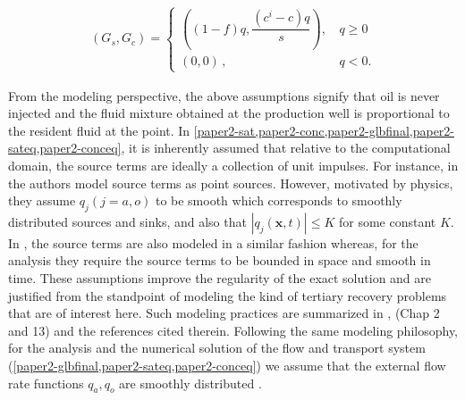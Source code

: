 \documentclass[11pt]{article}
\newcommand{\bx}{{\bf x}}
\newcommand{\lb}{\ensuremath{\lambda}}
\begin{document}
\begin{align}\label{paper2-eq:compat1}
(G_s, G_c) = \begin{cases} \left((1-f)q, \dfrac{(c^i - c)q}{s} \right), \, &q \geq 0 \\ (0,0) \, , \, &q<0. \end{cases}
\end{align}	

From the modeling perspective, the above assumptions signify that oil is never injected and the fluid mixture obtained at the production well is proportional to the resident fluid at the point. In \cref{paper2-sat,paper2-conc,paper2-glbfinal,paper2-sateq,paper2-conceq}, it is inherently assumed that relative to the computational domain, the source terms are ideally a collection of unit impulses. For instance, in \cite{EW1980} the authors model source terms as point sources. However, motivated by physics, they assume $q_j (j=a,o)$ to be smooth which corresponds to smoothly distributed sources and sinks, and also that $|q_j(\mathbf{x},t)| \leq K$ for some constant $K$. In \cite{D1983,R1985}, the source terms are also modeled in a similar fashion whereas, for the analysis they require the source terms to be bounded in space and smooth in time. These assumptions improve the regularity of the exact solution and are justified from the standpoint of modeling the kind of tertiary recovery problems that are of interest here. Such modeling practices are summarized in \cite{E1991}, \cite{CHM2006} (Chap 2 and 13) and the references cited therein. Following the same modeling philosophy, for the analysis and the numerical solution of the flow and transport system (\cref{paper2-glbfinal,paper2-sateq,paper2-conceq}) we assume that the external flow rate functions $q_a,q_o$ are smoothly distributed \cite{DFP1997}.
\end{document}
